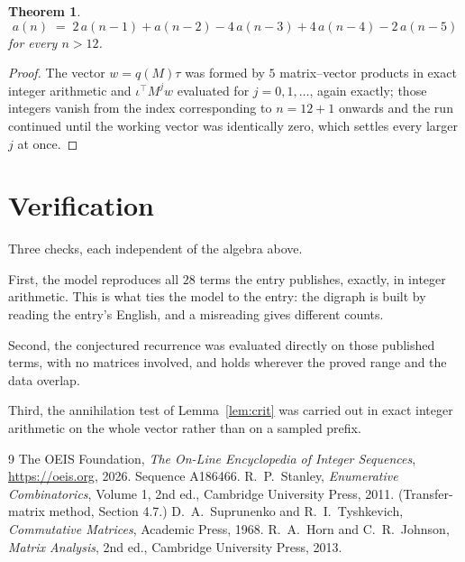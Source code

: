 \documentclass[11pt,a4paper]{article}
\theoremstyle{plain}
\newtheorem{theorem}{Theorem}
\theoremstyle{definition}
\begin{document}
\begin{theorem}
\[
a(n)\;=\;2\,a(n-1) + a(n-2) - 4\,a(n-3) + 4\,a(n-4) - 2\,a(n-5)
\]
for every $n>12$.
\end{theorem}

\begin{proof}
The vector $w=q(M)\tau$ was formed by $5$ matrix--vector products in exact integer
arithmetic and $\iota^{\!\top}M^{j}w$ evaluated for $j=0,1,\dots$, again exactly; those
integers vanish from the index corresponding to $n=12+1$ onwards and the run continued
until the working vector was identically zero, which settles every larger $j$ at once.
\end{proof}

\section{Verification}

Three checks, each independent of the algebra above.

First, the model reproduces all $28$ terms the entry publishes, exactly, in integer
arithmetic. This is what ties the model to the entry: the digraph is built by reading the
entry's English, and a misreading gives different counts.

Second, the conjectured recurrence was evaluated directly on those published terms, with no
matrices involved, and holds wherever the proved range and the data overlap.

Third, the annihilation test of Lemma~\ref{lem:crit} was carried out in exact integer
arithmetic on the whole vector rather than on a sampled prefix.

\begin{thebibliography}{9}
 The OEIS Foundation, \emph{The On-Line Encyclopedia of Integer
Sequences}, \url{https://oeis.org}, 2026. Sequence A186466.
 R.~P.~Stanley, \emph{Enumerative Combinatorics}, Volume 1, 2nd ed.,
Cambridge University Press, 2011. (Transfer-matrix method, Section 4.7.)
 D.~A.~Suprunenko and R.~I.~Tyshkevich, \emph{Commutative Matrices},
Academic Press, 1968.
 R.~A.~Horn and C.~R.~Johnson, \emph{Matrix Analysis}, 2nd ed., Cambridge
University Press, 2013.
\end{thebibliography}
\end{document}
